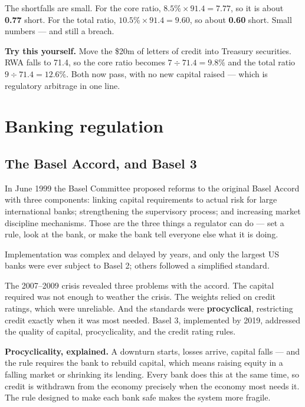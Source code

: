 \documentclass[11pt,a4paper]{article}
\newcommand{\keylab}[1]{\textcolor{ifclay}{\textbf{#1}}}
\begin{document}
The shortfalls are small. For the core ratio, $8.5\% \times 91.4 = 7.77$, so it
is about \textbf{0.77} short. For the total ratio, $10.5\% \times 91.4 = 9.60$,
so about \textbf{0.60} short. Small numbers --- and still a breach.

\begin{keybox}
\keylab{Try this yourself.} Move the \$20m of letters of credit into Treasury
securities. RWA falls to 71.4, so the core ratio becomes $7 \div 71.4 = 9.8\%$
and the total ratio $9 \div 71.4 = 12.6\%$. Both now pass, with no new capital
raised --- which is regulatory arbitrage in one line.
\end{keybox}

\section{Banking regulation}

\subsection*{The Basel Accord, and Basel 3}

In June 1999 the Basel Committee proposed reforms to the original Basel Accord
with three components: linking capital requirements to actual risk for large
international banks; strengthening the supervisory process; and increasing
market discipline mechanisms. Those are the three things a regulator can do ---
set a rule, look at the bank, or make the bank tell everyone else what it is
doing.

Implementation was complex and delayed by years, and only the largest US banks
were ever subject to Basel 2; others followed a simplified standard.

The 2007--2009 crisis revealed three problems with the accord. The capital
required was not enough to weather the crisis. The weights relied on credit
ratings, which were unreliable. And the standards were \textbf{procyclical},
restricting credit exactly when it was most needed. Basel 3, implemented by
2019, addressed the quality of capital, procyclicality, and the credit rating
rules.

\begin{keybox}
\keylab{Procyclicality, explained.} A downturn starts, losses arrive, capital
falls --- and the rule requires the bank to rebuild capital, which means raising
equity in a falling market or shrinking its lending. Every bank does this at the
same time, so credit is withdrawn from the economy precisely when the economy
most needs it. The rule designed to make each bank safe makes the system more
fragile.
\end{keybox}
\end{document}

